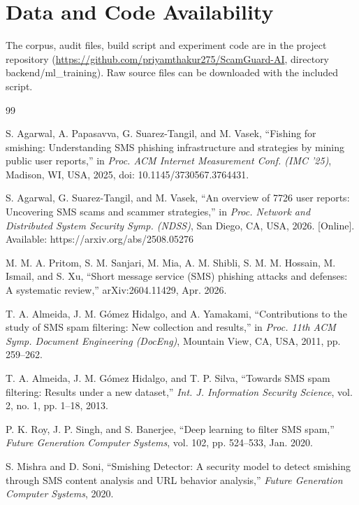 \documentclass[conference]{IEEEtran}
\renewcommand{\texttt}[1]{\textrm{#1}}  %
\begin{document}
\section*{Data and Code Availability}
The corpus, audit files, build script and experiment code are in the project repository (\url{https://github.com/priyamthakur275/ScamGuard-AI}, directory \texttt{backend/ml\_training}). Raw source files can be downloaded with the included script.

\balance
\begin{thebibliography}{99}

S. Agarwal, A. Papasavva, G. Suarez-Tangil, and M. Vasek, ``Fishing for smishing: Understanding SMS phishing infrastructure and strategies by mining public user reports,'' in \textit{Proc. ACM Internet Measurement Conf. (IMC '25)}, Madison, WI, USA, 2025, doi: 10.1145/3730567.3764431.

S. Agarwal, G. Suarez-Tangil, and M. Vasek, ``An overview of 7726 user reports: Uncovering SMS scams and scammer strategies,'' in \textit{Proc. Network and Distributed System Security Symp. (NDSS)}, San Diego, CA, USA, 2026. [Online]. Available: https://arxiv.org/abs/2508.05276

M. M. A. Pritom, S. M. Sanjari, M. Mia, A. M. Shibli, S. M. M. Hossain, M. Ismail, and S. Xu, ``Short message service (SMS) phishing attacks and defenses: A systematic review,'' arXiv:2604.11429, Apr. 2026.

T. A. Almeida, J. M. Gómez Hidalgo, and A. Yamakami, ``Contributions to the study of SMS spam filtering: New collection and results,'' in \textit{Proc. 11th ACM Symp. Document Engineering (DocEng)}, Mountain View, CA, USA, 2011, pp. 259--262.

T. A. Almeida, J. M. Gómez Hidalgo, and T. P. Silva, ``Towards SMS spam filtering: Results under a new dataset,'' \textit{Int. J. Information Security Science}, vol. 2, no. 1, pp. 1--18, 2013.

P. K. Roy, J. P. Singh, and S. Banerjee, ``Deep learning to filter SMS spam,'' \textit{Future Generation Computer Systems}, vol. 102, pp. 524--533, Jan. 2020.

S. Mishra and D. Soni, ``Smishing Detector: A security model to detect smishing through SMS content analysis and URL behavior analysis,'' \textit{Future Generation Computer Systems}, 2020.


\end{thebibliography}
\end{document}
